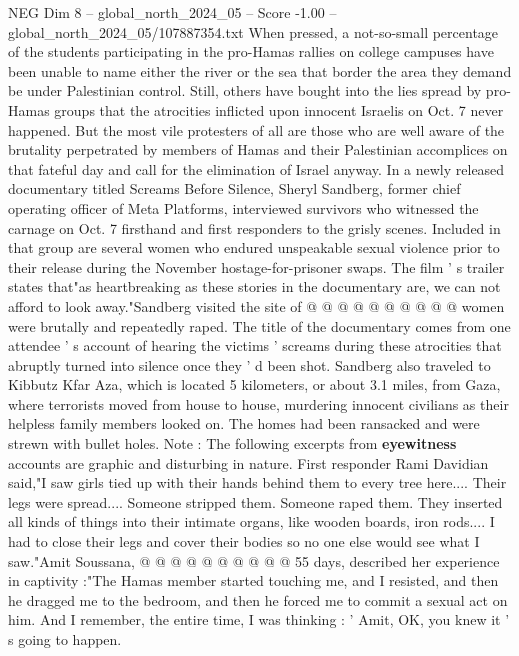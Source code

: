 \begin{textsample}{NEG Dim 8 – global\_north\_2024\_05 – Score -1.00 – global\_north\_2024\_05/107887354.txt}  \label{ex:f8_neg_379}
When pressed, a not-so-small percentage of the students participating in the pro-Hamas rallies on college campuses have been unable to name either the river or the sea that border the area they demand be under Palestinian control.
Still, others have bought into the lies spread by pro-Hamas groups that the atrocities inflicted upon innocent Israelis on Oct. 7 never happened.
But the most vile protesters of all are those who are well aware of the brutality perpetrated by members of Hamas and their Palestinian accomplices on that fateful day and call for the elimination of Israel anyway.
In a newly released documentary titled Screams Before Silence, Sheryl Sandberg, former chief operating officer of Meta Platforms, interviewed survivors who witnessed the carnage on Oct. 7 firsthand and first responders to the grisly scenes.
Included in that group are several women who endured unspeakable sexual violence prior to their release during the November hostage-for-prisoner swaps.
The film ' s trailer states that"as heartbreaking as these stories in the documentary are, we can not afford to look away."Sandberg visited the site of @ @ @ @ @ @ @ @ @ @ women were brutally and repeatedly raped.
The title of the documentary comes from one attendee ' s account of hearing the victims ' screams during these atrocities that abruptly turned into silence once they ' d been shot.
Sandberg also traveled to Kibbutz Kfar Aza, which is located 5 kilometers, or about 3.1 miles, from Gaza, where terrorists moved from house to house, murdering innocent civilians as their helpless family members looked on.
The homes had been ransacked and were strewn with bullet holes.
Note : The following excerpts from \textbf{eyewitness} accounts are graphic and disturbing in nature.
First responder Rami Davidian said,"I saw girls tied up with their hands behind them to every tree here....
Their legs were spread....
Someone stripped them.
Someone raped them.
They inserted all kinds of things into their intimate organs, like wooden boards, iron rods....
I had to close their legs and cover their bodies so no one else would see what I saw."Amit Soussana, @ @ @ @ @ @ @ @ @ @ 55 days, described her experience in captivity :"The Hamas member started touching me, and I resisted, and then he dragged me to the bedroom, and then he forced me to commit a sexual act on him.
And I remember, the entire time, I was thinking : ' Amit, OK, you knew it ' s going to happen.

\end{textsample}
